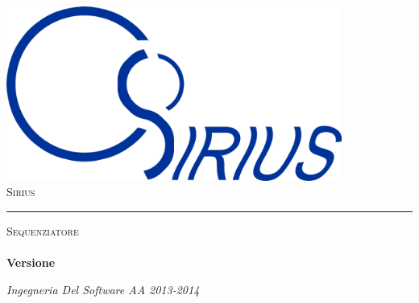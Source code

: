 \begin{titlepage}
 \begin{center}
     \includegraphics[width=11cm]{../../modello/img/sirius}\\
     \vspace{1em}
     {\LARGE \textsc{Sirius}}\\
     \vspace{2em} \hrule \vspace{2em}
     {\Large \textsc{Sequenziatore}}\\
     \vspace{8em}
     {\LARGE \LARGE \LARGE \textbf{\doctitle}}\\
     \vspace{2em}
     {\LARGE \LARGE \LARGE \textbf{Versione \lastversion }}\\
     \vspace{4em}
 \end{center}


\vskip 1.8cm
\begin{center}
\textit{Ingegneria Del Software AA 2013-2014}
\end{center}

\end{titlepage}


